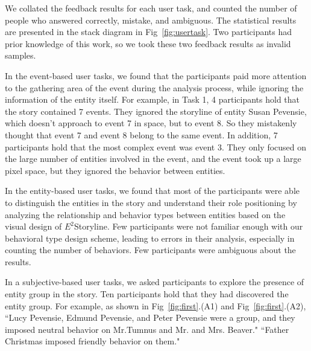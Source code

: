 \documentclass[review,journal]{vgtc}         %
\begin{document}
We collated the feedback results for each user task, and counted the number of people who answered correctly, mistake, and ambiguous. The statistical results are presented in the stack diagram in Fig~\ref{fig:usertask}. Two participants had prior knowledge of this work, so we took these two feedback results as invalid samples.

In the event-based user tasks, we found that the participants paid more attention to the gathering area of the event during the analysis process, while ignoring the information of the entity itself. For example, in Task 1, 4 participants hold that the story contained 7 events. They ignored the storyline of entity Susan Pevensie, which doesn't approach
to event 7 in space, but to event 8. So they mistakenly thought that event 7 and event 8 belong to the same event. In addition, 7 participants hold that the most complex event was event 3. They only focused on the large number of entities involved in the event, and the event took up a large pixel space, but they ignored the behavior between entities.

In the entity-based user tasks, we found that most of the participants were able to distinguish the entities in the story and understand their role positioning by analyzing the relationship and behavior types between entities based on the visual design of $E^2$Storyline. Few participants were not familiar enough with our behavioral type design scheme, leading to errors in their analysis, especially in counting the number of behaviors. Few participants were ambiguous about the results.

In a subjective-based user tasks, we asked participants to explore the presence of entity group in the story.
Ten participants hold that they had discovered the entity group.
For example, as shown in Fig~\ref{fig:first}.(A1) and Fig~\ref{fig:first}.(A2), ``Lucy Pevensie, Edmund Pevensie, and Peter Pevensie were a group, and they imposed neutral behavior on Mr.Tumnus and Mr. and Mrs. Beaver."  ``Father Christmas imposed friendly behavior on them."
\end{document}
